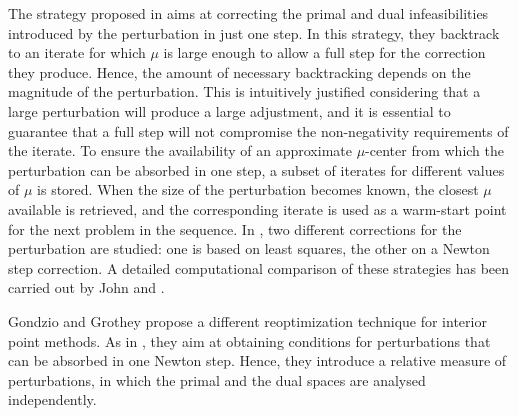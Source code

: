 The strategy proposed in \cite{YildirimWright} aims at correcting the 
primal and dual infeasibilities introduced by the perturbation in just 
one step.
In this strategy, they backtrack to an iterate for which $\mu$ is 
large enough to allow a full step for the correction they produce. 
Hence, the amount of necessary backtracking depends on the magnitude 
of the perturbation.
This is intuitively justified considering that a large perturbation 
will produce a large adjustment, and it is essential to guarantee that 
a full step will not compromise the non-negativity requirements of the 
iterate.
%
To ensure the availability of an approximate $\mu$-center from which 
the perturbation can be absorbed in one step, a subset of 
iterates for different values of $\mu$ is stored.
When the size of the perturbation becomes known, the closest $\mu$ 
available is retrieved, and the corresponding iterate is used as a 
warm-start point for the next problem in the sequence.
%
In \cite{YildirimWright}, two different corrections for the perturbation
are studied: one is based on least squares, the other on a Newton step 
correction.
A detailed computational comparison of these strategies has been 
carried out by John and \yildirim \cite{JohnYildirim}.

Gondzio and Grothey \cite{GondzioGrothey03} propose a different 
reoptimization technique for interior point methods.
As in \cite{YildirimWright}, they aim at obtaining conditions for 
perturbations that can be absorbed in one Newton step.
Hence, they introduce a relative measure of perturbations, in which 
the primal and the dual spaces are analysed independently.


